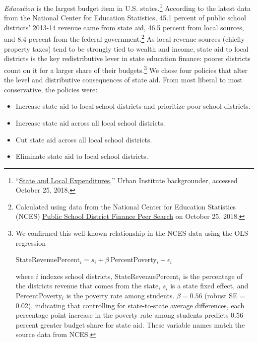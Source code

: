 \documentclass[12pt]{article}
\begin{document}
\textit{Education} is the largest budget item in U.S. states.\footnote{``\href{https://www.urban.org/policy-centers/cross-center-initiatives/state-local-finance-initiative/projects/state-and-local-backgrounders/state-and-local-expenditures}{State and Local Expenditures},'' Urban Institute backgrounder, accessed October 25, 2018.} According to the latest data from the National Center for Education Statistics, 45.1 percent of public school districts' 2013-14 revenue came from state aid, 46.5 percent from local sources, and 8.4 percent from the federal government.\footnote{Calculated using data from the National Center for Education Statistics (NCES) \href{https://nces.ed.gov/edfin/search/advanced.asp}{Public School District Finance Peer Search} on October 25, 2018.} As local revenue sources (chiefly property taxes) tend to be strongly tied to wealth and income, state aid to local districts is the key redistributive lever in state education finance: poorer districts count on it for a larger share of their budgets.\footnote{We confirmed this well-known relationship in the NCES data using the OLS regression
\vspace{-1mm}
\begin{center}
StateRevenuePercent$_i = s_i + \beta~$PercentPoverty$_i + \epsilon_i$
\end{center}
\vspace{-1mm}
where $i$ indexes school districts, StateRevenuePercent$_i$ is the percentage of the districts revenue that comes from the state, $s_i$ is a state fixed effect, and PercentPoverty$_i$ is the poverty rate among students. $\beta = 0.56$ (robust SE = 0.02), indicating that controlling for state-to-state average differences, each percentage point increase in the poverty rate among students predicts 0.56 percent greater budget share for state aid. These variable names match the source data from NCES.} We chose four policies that alter the level and distributive consequences of state aid. From most liberal to most conservative, the policies were:
\begin{itemize}
\setlength\itemsep{-.25em}
\singlespacing
\item Increase state aid to local school districts and prioritize poor school districts.
\item Increase state aid across all local school districts.
\item Cut state aid across all local school districts.
\item Eliminate state aid to local school districts.
\end{itemize}
\end{document}

